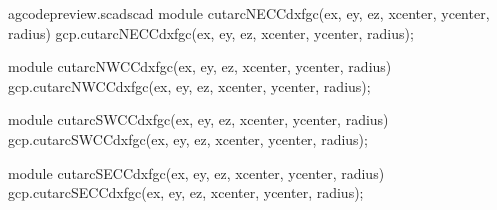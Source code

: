 \documentclass{ltxdoc}
\begin{document}
\lstset{firstnumber=\thegcpscad}
\begin{writecode}{a}{gcodepreview.scad}{scad}
module cutarcNECCdxfgc(ex, ey, ez, xcenter, ycenter, radius){
    gcp.cutarcNECCdxfgc(ex, ey, ez, xcenter, ycenter, radius);
}

module cutarcNWCCdxfgc(ex, ey, ez, xcenter, ycenter, radius){
    gcp.cutarcNWCCdxfgc(ex, ey, ez, xcenter, ycenter, radius);
}

module cutarcSWCCdxfgc(ex, ey, ez, xcenter, ycenter, radius){
    gcp.cutarcSWCCdxfgc(ex, ey, ez, xcenter, ycenter, radius);
}

module cutarcSECCdxfgc(ex, ey, ez, xcenter, ycenter, radius){
    gcp.cutarcSECCdxfgc(ex, ey, ez, xcenter, ycenter, radius);
}
\end{writecode}
\addtocounter{gcpscad}{16}

%
\end{document}
